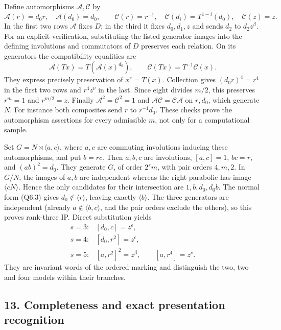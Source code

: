 \documentclass[
  10pt,
  letterpaper,
]{article}
\begin{document}
Define automorphisms \(\mathcal A,\mathcal C\) by \[
 \mathcal A(r)=d_0r,\quad \mathcal A(d_0)=d_0,\qquad
 \mathcal C(r)=r^{-1},\quad
 \mathcal C(d_i)=T^{1-i}(d_0),\quad\mathcal C(z)=z.
\] In the first two rows \(\mathcal A\) fixes \(D\); in the third it
fixes \(d_0,d_1,z\) and sends \(d_2\) to \(d_2z^\beta\). For an explicit
verification, substituting the listed generator images into the defining
involutions and commutators of \(D\) preserves each relation. On its
generators the compatibility equalities are \[
 \mathcal A(Tx)=T(\mathcal A(x)^{d_0}),\qquad
 \mathcal C(Tx)=T^{-1}\mathcal C(x).
\] They express precisely preservation of \(x^r=T(x)\). Collection gives
\((d_0r)^4=r^4\) in the first two rows and \(r^4z^\nu\) in the last.
Since eight divides \(m/2\), this preserves \(r^m=1\) and \(r^{m/2}=z\).
Finally \(\mathcal A^2=\mathcal C^2=1\) and
\(\mathcal A\mathcal C=\mathcal C\mathcal A\) on \(r,d_0\), which
generate \(N\). For instance both composites send \(r\) to
\(r^{-1}d_0\). These checks prove the automorphism assertions for every
admissible \(m\), not only for a computational sample.

Set \(G=N\rtimes\langle a,c\rangle\), where \(a,c\) are commuting
involutions inducing these automorphisms, and put \(b=rc\). Then
\(a,b,c\) are involutions, \([a,c]=1\), \(bc=r\), and \((ab)^2=d_0\).
They generate \(G\), of order \(2^s m\), with pair orders \(4,m,2\). In
\(G/N\), the images of \(a,b\) are independent whereas the right
parabolic has image \(\langle cN\rangle\). Hence the only candidates for
their intersection are \(1,b,d_0,d_0b\). The normal form (Q6.3) gives
\(d_0\notin\langle r\rangle\), leaving exactly \(\langle b\rangle\). The
three generators are independent (already \(a\notin\langle b,c\rangle\),
and the pair orders exclude the others), so this proves rank-three IP.
Direct substitution yields \[
 \begin{array}{ll}
 s=3:&[d_0,c]=z^\epsilon,\\
 s=4:&[d_0,r^2]=z^\epsilon,\\
 s=5:&[a,r^2]^2=z^\beta,\qquad[a,r^4]=z^\nu.
 \end{array}                                                   \tag{Q6.4}
\] They are invariant words of the ordered marking and distinguish the
two, two and four models within their branches.

\subsection{13. Completeness and exact presentation
recognition}\label{completeness-and-exact-presentation-recognition}
\end{document}
